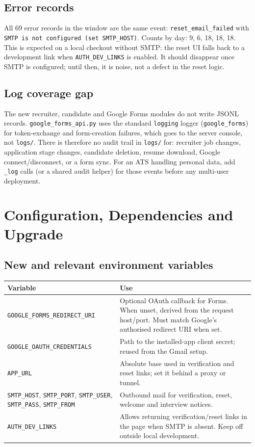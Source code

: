 \documentclass[11pt,a4paper]{article}
\newcommand{\file}[1]{\texttt{\small #1}}
\newcommand{\code}[1]{\texttt{#1}}
\newcommand{\env}[1]{\texttt{\small #1}}
\begin{document}
\subsection{Error records}
All 69 error records in the window are the same event:
\code{reset\_email\_failed} with \code{SMTP is not configured (set
SMTP\_HOST)}. Counts by day: 9, 6, 18, 18, 18. This is expected on a local
checkout without SMTP: the reset UI falls back to a development link when
\env{AUTH\_DEV\_LINKS} is enabled. It should disappear once SMTP is configured;
until then, it is noise, not a defect in the reset logic.

\subsection{Log coverage gap}
The new recruiter, candidate and Google Forms modules do not write JSONL
records. \file{google\_forms\_api.py} uses the standard \code{logging} logger
(\code{google\_forms}) for token-exchange and form-creation failures, which
goes to the server console, not \file{logs/}. There is therefore no audit
trail in \file{logs/} for: recruiter job changes, application stage changes,
candidate deletion, resume download, Google connect/disconnect, or a form
sync. For an ATS handling personal data, add \code{\_log} calls (or a shared
audit helper) for those events before any multi-user deployment.

\section{Configuration, Dependencies and Upgrade}
\label{u:config}

\subsection{New and relevant environment variables}
\begin{center}
\begin{tabular}{@{}lp{10.7cm}@{}}
\toprule
\textbf{Variable} & \textbf{Use}\\
\midrule
\env{GOOGLE\_FORMS\_REDIRECT\_URI} & Optional OAuth callback for Forms. When
  unset, derived from the request host/port. Must match Google's authorised
  redirect URI when set.\\
\env{GOOGLE\_OAUTH\_CREDENTIALS} & Path to the installed-app client secret;
  reused from the Gmail setup.\\
\env{APP\_URL} & Absolute base used in verification and reset links; set it
  behind a proxy or tunnel.\\
\env{SMTP\_HOST}, \env{SMTP\_PORT}, \env{SMTP\_USER}, \env{SMTP\_PASS},
  \env{SMTP\_FROM} & Outbound mail for verification, reset, welcome and
  interview notices.\\
\env{AUTH\_DEV\_LINKS} & Allows returning verification/reset links in the page
  when SMTP is absent. Keep off outside local development.\\
\bottomrule
\end{tabular}
\end{center}
\end{document}
